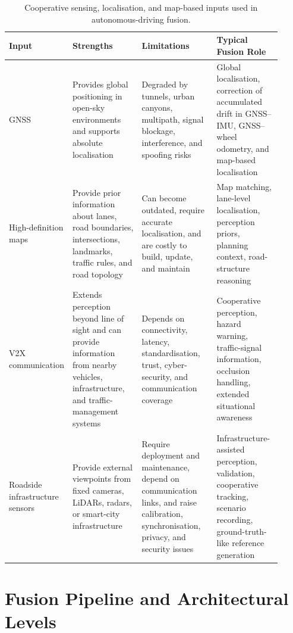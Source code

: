 \documentclass[11pt,oneside,openany]{book}
\begin{document}
\begin{table}[!t]
    \centering
    \small
    \caption{Cooperative sensing, localisation, and map-based inputs used in autonomous-driving fusion.}
    \label{tab:av-cooperative-inputs}
    \begin{tabular}{p{0.13\linewidth} p{0.26\linewidth} p{0.28\linewidth} p{0.24\linewidth}}
        \hline
        \textbf{Input} & \textbf{Strengths} & \textbf{Limitations} & \textbf{Typical Fusion Role} \\
        \hline
        GNSS & Provides global positioning in open-sky environments and supports absolute localisation & Degraded by tunnels, urban canyons, multipath, signal blockage, interference, and spoofing risks & Global localisation, correction of accumulated drift in GNSS--IMU, GNSS--wheel odometry, and map-based localisation \\
        \hline
        High-definition maps & Provide prior information about lanes, road boundaries, intersections, landmarks, traffic rules, and road topology & Can become outdated, require accurate localisation, and are costly to build, update, and maintain & Map matching, lane-level localisation, perception priors, planning context, road-structure reasoning \\
        \hline
        V2X communication & Extends perception beyond line of sight and can provide information from nearby vehicles, infrastructure, and traffic-management systems & Depends on connectivity, latency, standardisation, trust, cyber-security, and communication coverage & Cooperative perception, hazard warning, traffic-signal information, occlusion handling, extended situational awareness \\
        \hline
        Roadside infrastructure sensors & Provide external viewpoints from fixed cameras, LiDARs, radars, or smart-city infrastructure & Require deployment and maintenance, depend on communication links, and raise calibration, synchronisation, privacy, and security issues & Infrastructure-assisted perception, validation, cooperative tracking, scenario recording, ground-truth-like reference generation \\
        \hline
    \end{tabular}
\end{table}

\section{Fusion Pipeline and Architectural Levels}
\end{document}

